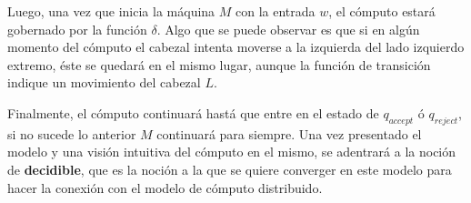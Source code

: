 \documentclass[10pt]{report}
\begin{document}
    Luego, una vez que inicia la máquina $M$ con la entrada $w$, el cómputo estará gobernado por la función $\delta$.
    Algo que se puede observar es que si en algún momento del cómputo el cabezal intenta moverse a la izquierda del lado
    izquierdo extremo, éste se quedará en el mismo lugar, aunque la función de transición indique un movimiento del cabezal $L$.
    \newline

    Finalmente, el cómputo continuará hastá que entre en el estado de $q_{accept}$ ó $q_{reject}$,
    si no sucede lo anterior $M$ continuará para siempre.
    Una vez presentado el modelo y una visión intuitiva del cómputo en el mismo, se adentrará a la noción de
    \textbf{decidible}, que es la noción a la que se quiere converger en este modelo para hacer la conexión con el modelo
    de cómputo distribuido.

    \newline
\end{document}
